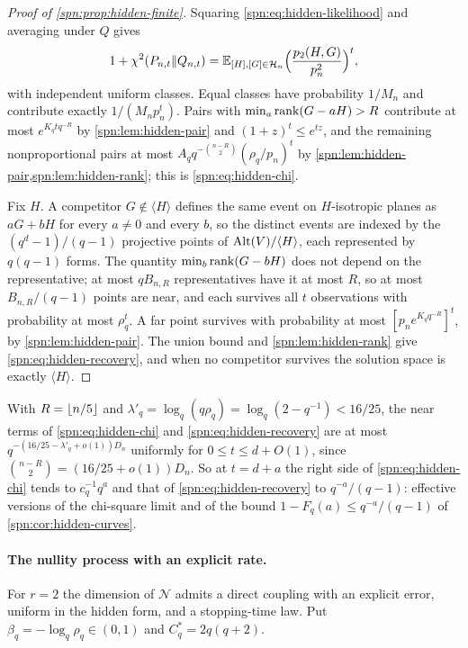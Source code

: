 \begin{proof}[Proof of \cref{spn:prop:hidden-finite}]
Squaring \eqref{spn:eq:hidden-likelihood} and averaging under $Q$ gives
\begin{equation}\label{spn:eq:hidden-second}
 1+\chi^2(P_{n,t}\Vert Q_{n,t})=\mathbb{E}_{[H],[G]\in\mathcal H_n}\Bigl(\frac{p_2(H,G)}{p_n^2}\Bigr)^t,
\end{equation}
with independent uniform classes. Equal classes have probability $1/M_n$ and contribute exactly
$1/(M_np_n^t)$. Pairs with $\min_a\operatorname{rank}(G-aH)>R$ contribute at most $e^{K_qtq^{-R}}$ by
\cref{spn:lem:hidden-pair} and $(1+z)^t\le e^{tz}$, and the remaining nonproportional pairs at most
$A_qq^{-\binom{n-R}2}(\rho_q/p_n)^t$ by \cref{spn:lem:hidden-pair,spn:lem:hidden-rank}; this is
\eqref{spn:eq:hidden-chi}.

Fix $H$. A competitor $G\notin\langle H\rangle$ defines the same event on $H$-isotropic planes as
$aG+bH$ for every $a\ne0$ and every $b$, so the distinct events are indexed by the $(q^d-1)/(q-1)$
projective points of $\operatorname{Alt}(V)/\langle H\rangle$, each represented by $q(q-1)$ forms. The quantity
$\min_b\operatorname{rank}(G-bH)$ does not depend on the representative; at most $qB_{n,R}$ representatives have
it at most $R$, so at most $B_{n,R}/(q-1)$ points are near, and each survives all $t$ observations
with probability at most $\rho_q^t$. A far point survives with probability at most
$[p_ne^{K_qq^{-R}}]^t$, by \cref{spn:lem:hidden-pair}. The union bound and \cref{spn:lem:hidden-rank}
give \eqref{spn:eq:hidden-recovery}, and when no competitor survives the solution space is exactly
$\langle H\rangle$.
\end{proof}

With $R=\lfloor n/5\rfloor$ and $\lambda'_q=\log_q(q\rho_q)=\log_q(2-q^{-1})<16/25$, the near terms of
\eqref{spn:eq:hidden-chi} and \eqref{spn:eq:hidden-recovery} are at most
$q^{-(16/25-\lambda'_q+o(1))D_n}$ uniformly for $0\le t\le d+O(1)$, since
$\binom{n-R}2=(16/25+o(1))D_n$. So at $t=d+a$ the right side of \eqref{spn:eq:hidden-chi} tends to
$c_q^{-1}q^a$ and that of \eqref{spn:eq:hidden-recovery} to $q^{-a}/(q-1)$: effective versions of
the chi-square limit and of the bound $1-F_q(a)\le q^{-a}/(q-1)$ of \cref{spn:cor:hidden-curves}.

\paragraph{The nullity process with an explicit rate.}
For $r=2$ the dimension of $\mathcal N$ admits a direct coupling with an explicit error, uniform in the
hidden form, and a stopping-time law. Put $\beta_q=-\log_q\rho_q\in(0,1)$ and $C^\ast_q=2q(q+2)$.

